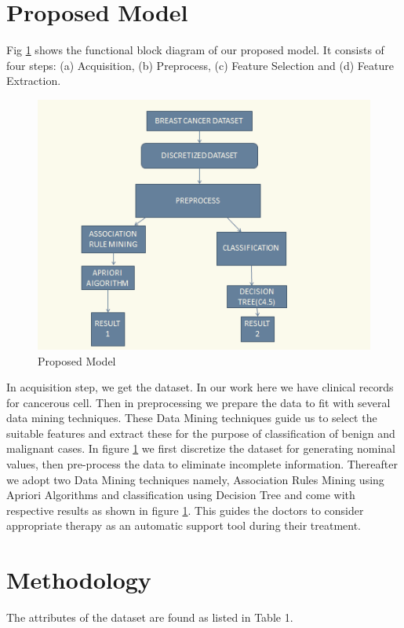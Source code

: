 \documentclass[conference]{IEEEtran}
\begin{document}
\section{Proposed Model}
Fig \ref{fig_sin1} shows the functional block diagram of our proposed model. It consists of four steps: (a) Acquisition, (b) Preprocess, (c) Feature Selection and (d) Feature Extraction.
\begin{figure}[!h]
\centering
\includegraphics[scale=0.7]{PROPMODEL}
\caption{Proposed Model}
\label{fig_sin1}
\end{figure}

In acquisition step, we get the dataset. In our work here we have clinical records for cancerous cell. Then in preprocessing we prepare the data to fit with several data mining techniques. These Data Mining techniques guide us to select the suitable features and extract these for the purpose of classification of benign and malignant cases. In figure \ref{fig_sin1}  we first discretize the dataset for generating nominal values, then pre-process the data to eliminate incomplete information. Thereafter we adopt two Data Mining techniques namely, Association Rules Mining using Apriori Algorithms and classification using Decision Tree and come with respective results as shown in figure \ref{fig_sin1}. This guides the doctors to consider appropriate therapy as an automatic support tool during their treatment.

\section{Methodology}
The attributes of the dataset are found as listed in Table 1.
\vspace{.3 cm}
\end{document}
